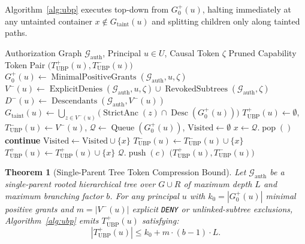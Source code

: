 \documentclass[conference]{IEEEtran}
\newtheorem{theorem}{Theorem}
\begin{document}
Algorithm~\ref{alg:ubp} executes top-down from $G_0^+(u)$, halting immediately at any untainted container $x \notin G_{\text{taint}}(u)$ and splitting children only along tainted paths.

\begin{algorithm}[t]
\caption{Subtractive-Aware Upward Boundary Pruning ($\mathcal{P}_{\text{UBP}}$)}
\label{alg:ubp}
\begin{algorithmic}[1]
\Require Authorization Graph $\mathcal{G}_{\text{auth}}$, Principal $u \in U$, Causal Token $\zeta$
\Ensure Pruned Capability Token Pair $\big(T_{\text{UBP}}^+(u), T_{\text{UBP}}^-(u)\big)$
\State $G_0^+(u) \gets \operatorname{MinimalPositiveGrants}(\mathcal{G}_{\text{auth}}, u, \zeta)$
\State $V^-(u) \gets \operatorname{ExplicitDenies}(\mathcal{G}_{\text{auth}}, u, \zeta) \cup \operatorname{RevokedSubtrees}(\mathcal{G}_{\text{auth}}, \zeta)$
\State $D^-(u) \gets \operatorname{Descendants}(\mathcal{G}_{\text{auth}}, V^-(u))$
\State $G_{\text{taint}}(u) \gets \bigcup_{z \in V^-(u)} \big(\operatorname{StrictAnc}(z) \cap \operatorname{Desc}(G_0^+(u))\big)$
\State $T_{\text{UBP}}^+(u) \gets \emptyset$, \quad $T_{\text{UBP}}^-(u) \gets V^-(u)$, \quad $\mathcal{Q} \gets \operatorname{Queue}(G_0^+(u))$, \quad $\text{Visited} \gets \emptyset$
    \State $x \gets \mathcal{Q}.\operatorname{pop}()$
     \textbf{continue} \EndIf
    \State $\text{Visited} \gets \text{Visited} \cup \{x\}$
        \State $T_{\text{UBP}}^-(u) \gets T_{\text{UBP}}^-(u) \cup \{x\}$ 
        \State $T_{\text{UBP}}^+(u) \gets T_{\text{UBP}}^+(u) \cup \{x\}$ 
    \Else
            \State $\mathcal{Q}.\operatorname{push}(c)$ 
        \EndFor
    \EndIf
\EndWhile
\State \Return $\big(T_{\text{UBP}}^+(u), T_{\text{UBP}}^-(u)\big)$
\end{algorithmic}
\end{algorithm}

\begin{theorem}[Single-Parent Tree Token Compression Bound]
\label{thm:ubp_bound}
Let $\mathcal{G}_{\text{auth}}$ be a single-parent rooted hierarchical tree over $G \cup R$ of maximum depth $L$ and maximum branching factor $b$. For any principal $u$ with $k_0 = |G_0^+(u)|$ minimal positive grants and $m = |V^-(u)|$ explicit \texttt{DENY} or unlinked-subtree exclusions, Algorithm~\ref{alg:ubp} emits $T_{\text{UBP}}^+(u)$ satisfying:
\begin{equation}
\label{eq:ubp_bound}
|T_{\text{UBP}}^+(u)| \le k_0 + m \cdot (b - 1) \cdot L.
\end{equation}
\end{theorem}
\end{document}
